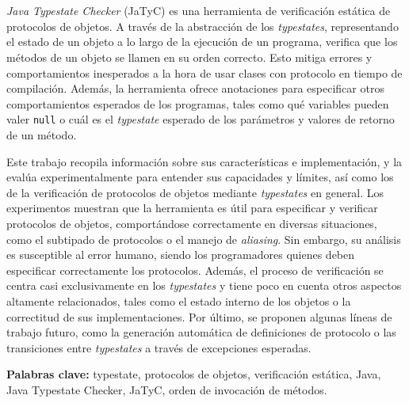 \chapter*{\runtitulo}

\noindent \textit{Java Typestate Checker} (JaTyC) es una herramienta de verificación estática de protocolos de objetos. A través de la abstracción de los \textit{typestates}, representando el estado de un objeto a lo largo de la ejecución de un programa, verifica que los métodos de un objeto se llamen en su orden correcto. Esto mitiga errores y comportamientos inesperados a la hora de usar clases con protocolo en tiempo de compilación. Además, la herramienta ofrece anotaciones para especificar otros comportamientos esperados de los programas, tales como qué variables pueden valer \texttt{null} o cuál es el \textit{typestate} esperado de los parámetros y valores de retorno de un método.

Este trabajo recopila información sobre sus características e implementación, y la evalúa experimentalmente para entender sus capacidades y límites, así como los de la verificación de protocolos de objetos mediante \textit{typestates} en general. Los experimentos muestran que la herramienta es útil para especificar y verificar protocolos de objetos, comportándose correctamente en diversas situaciones, como el subtipado de protocolos o el manejo de \textit{aliasing}. Sin embargo, su análisis es susceptible al error humano, siendo los programadores quienes deben especificar correctamente los protocolos. Además, el proceso de verificación se centra casi exclusivamente en los \textit{typestates} y tiene poco en cuenta otros aspectos altamente relacionados, tales como el estado interno de los objetos o la correctitud de sus implementaciones. Por último, se proponen algunas líneas de trabajo futuro, como la generación automática de definiciones de protocolo o las transiciones entre \textit{typestates} a través de excepciones esperadas.
\bigskip

\noindent\textbf{Palabras clave:} typestate, protocolos de objetos, verificación estática, Java, Java Typestate Checker, JaTyC, orden de invocación de métodos.
